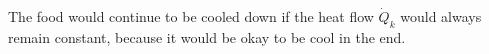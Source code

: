 The food would continue to be cooled down if the heat flow \(\dot{Q}_{k}\) would always remain constant, because it would be okay to be cool in the end.